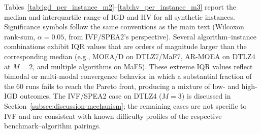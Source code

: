\documentclass[pdflatex,sn-mathphys-ay]{sn-jnl}%
\theoremstyle{thmstyleone}%
\theoremstyle{thmstyletwo}%
\theoremstyle{thmstylethree}%
\begin{document}
Tables~\ref{tab:igd_per_instance_m2}--\ref{tab:hv_per_instance_m3} report the median and interquartile range of IGD and HV for all synthetic instances. Significance symbols follow the same conventions as the main text (Wilcoxon rank-sum, $\alpha=0.05$, from IVF/SPEA2's perspective). Several algorithm--instance combinations exhibit IQR values that are orders of magnitude larger than the corresponding median (e.g., MOEA/D on DTLZ7/MaF7, AR-MOEA on DTLZ4 at $M{=}2$, and multiple algorithms on MaF5). These extreme IQR values reflect bimodal or multi-modal convergence behavior in which a substantial fraction of the 60 runs fails to reach the Pareto front, producing a mixture of low- and high-IGD outcomes. The IVF/SPEA2 case on DTLZ4 ($M{=}3$) is discussed in Section~\ref{subsec:discussion-mechanism}; the remaining cases are not specific to IVF and are consistent with known difficulty profiles of the respective benchmark--algorithm pairings.
\end{document}
